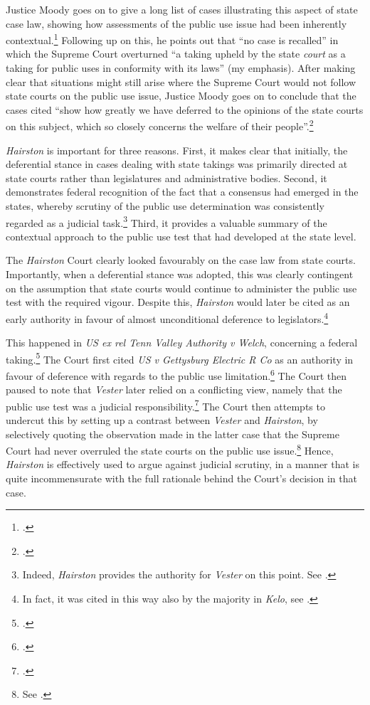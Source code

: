 Justice Moody goes on to give a long list of cases illustrating this aspect of state case law, showing how assessments of the public use issue had been inherently contextual.\footcite[607]{hairston08} Following up on this, he points out that ``no case is recalled'' in which the Supreme Court overturned ``a taking upheld by the state {\it court} as a taking for public uses in conformity with its laws'' (my emphasis). After making clear that situations might still arise where the Supreme Court would not follow state courts on the public use issue, Justice Moody goes on to conclude that the cases cited ``show how greatly we have deferred to the opinions of the state courts on this subject, which so closely concerns the welfare of their people''.\footcite[606]{hairston08}

{\it Hairston} is important for three reasons. First, it makes clear that initially, the deferential stance in cases dealing with state takings was primarily directed at state courts rather than legislatures and administrative bodies. Second, it demonstrates federal recognition of the fact that a consensus had emerged in the states, whereby scrutiny of the public use determination was consistently regarded as a judicial task.\footnote{Indeed, {\it Hairston} provides the authority for {\it Vester} on this point. See \cite[606]{vester30}.} Third, it provides a valuable summary of the contextual approach to the public use test that had developed at the state level. 

The {\it Hairston} Court clearly looked favourably on the case law from state courts. Importantly, when a deferential stance was adopted, this was clearly contingent on the assumption that state courts would continue to administer the public use test with the required vigour. Despite this, {\it Hairston} would later be cited as an early authority in favour of almost unconditional deference to legislators.\footnote{In fact, it was cited in this way also by the majority in {\it Kelo}, see \cite[482-483]{kelo05}.} 

This happened in {\it US ex rel Tenn Valley Authority v Welch}, concerning a federal taking.\footcite[552]{welch46} The Court first cited {\it US v Gettysburg Electric R Co} as an authority in favour of deference with regards to the public use limitation.\footcite{gettysburg96} The Court then paused to note that {\it Vester} later relied on a conflicting view, namely that the public use test was a judicial responsibility.\footcite{vester30} The Court then attempts to undercut this by setting up a contrast between {\it Vester} and {\it Hairston}, by selectively quoting the observation made in the latter case that the Supreme Court had never overruled the state courts on the public use issue.\footnote{See \cite[552]{welch46}.} Hence, {\it Hairston} is effectively used to argue against judicial scrutiny, in a manner that is quite incommensurate with the full rationale behind the Court's decision in that case.

